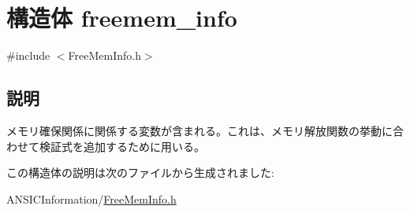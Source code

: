 \section{構造体 freemem\_\-info}
\label{structfreemem__info}


{\ttfamily \#include $<$FreeMemInfo.h$>$}



\subsection{説明}
メモリ確保関係に関係する変数が含まれる。これは、メモリ解放関数の挙動に合わせて検証式を追加するために用いる。 

この構造体の説明は次のファイルから生成されました:\begin{DoxyCompactItemize}
\item 
ANSICInformation/\hyperlink{FreeMemInfo_8h}{FreeMemInfo.h}\end{DoxyCompactItemize}
